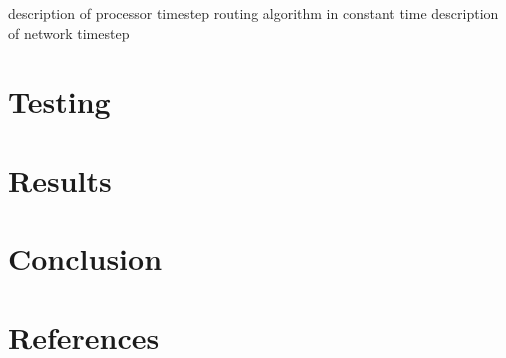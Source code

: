 \documentclass[a4paper, 12pt]{article}
\begin{document}
description of processor timestep
routing algorithm in constant time
description of network timestep

\newpage
\section{Testing}



\newpage
\section{Results}



\newpage
\section{Conclusion}



\newpage
\section{References}
\end{document}
